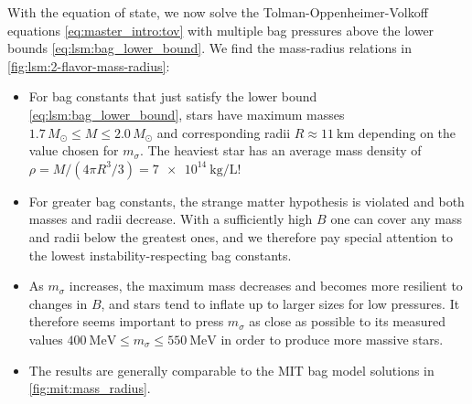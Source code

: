 With the equation of state, we now solve the Tolman-Oppenheimer-Volkoff equations \eqref{eq:master_intro:tov} with multiple bag pressures above the lower bounds \eqref{eq:lsm:bag_lower_bound}.
We find the mass-radius relations in \cref{fig:lsm:2-flavor-mass-radius}:
\begin{itemize}
\item For bag constants that just satisfy the lower bound \eqref{eq:lsm:bag_lower_bound},
      stars have maximum masses $1.7 \, M_\odot \leq M \leq 2.0 \, M_\odot$ and corresponding radii $R \approx \SI{11}{\kilo\meter}$
      depending on the value chosen for $m_\sigma$.
      The heaviest star has an average mass density of $\rho = M / (4 \pi R^3/3) = \SI{7e14}{\kilo\gram\per\liter}$!
\item For greater bag constants,
      the strange matter hypothesis is violated and both masses and radii decrease.
      With a sufficiently high $B$ one can cover any mass and radii below the greatest ones,
      and we therefore pay special attention to the lowest instability-respecting bag constants.
\item As $m_\sigma$ increases,
      the maximum mass decreases and becomes more resilient to changes in $B$, and stars tend to inflate up to larger sizes for low pressures.
      It therefore seems important to press $m_\sigma$ as close as possible 
      to its measured values $\SI{400}{\mega\electronvolt} \leq m_\sigma \leq \SI{550}{\mega\electronvolt}$
      in order to produce more massive stars.
\item The results are generally comparable to the MIT bag model solutions in \cref{fig:mit:mass_radius}.
\end{itemize}

